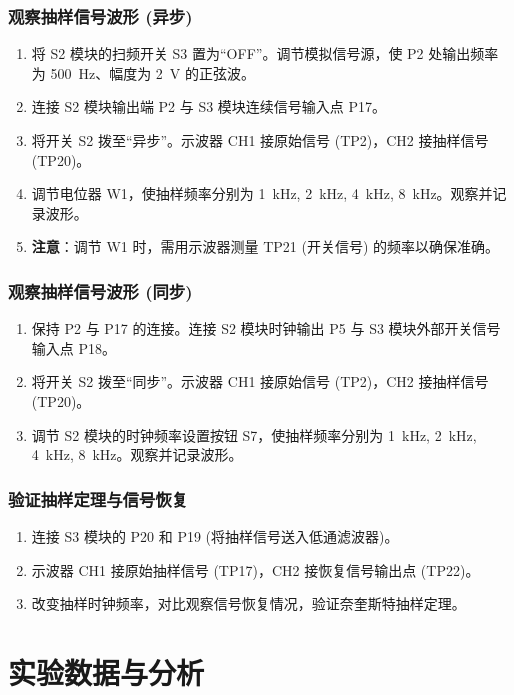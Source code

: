 \documentclass[12pt, a4paper]{ctexrep}
\begin{document}
\subsubsection{观察抽样信号波形 (异步)}
\begin{enumerate}
    \item 将 S2 模块的扫频开关 S3 置为“OFF”。调节模拟信号源，使 P2 处输出频率为 \SI{500}{Hz}、幅度为 \SI{2}{V} 的正弦波。
    \item 连接 S2 模块输出端 P2 与 S3 模块连续信号输入点 P17。
    \item 将开关 S2 拨至“异步”。示波器 CH1 接原始信号 (TP2)，CH2 接抽样信号 (TP20)。
    \item 调节电位器 W1，使抽样频率分别为 \SI{1}{kHz}, \SI{2}{kHz}, \SI{4}{kHz}, \SI{8}{kHz}。观察并记录波形。
    \item \textbf{注意}：调节 W1 时，需用示波器测量 TP21 (开关信号) 的频率以确保准确。
\end{enumerate}

\subsubsection{观察抽样信号波形 (同步)}
\begin{enumerate}
    \item 保持 P2 与 P17 的连接。连接 S2 模块时钟输出 P5 与 S3 模块外部开关信号输入点 P18。
    \item 将开关 S2 拨至“同步”。示波器 CH1 接原始信号 (TP2)，CH2 接抽样信号 (TP20)。
    \item 调节 S2 模块的时钟频率设置按钮 S7，使抽样频率分别为 \SI{1}{kHz}, \SI{2}{kHz}, \SI{4}{kHz}, \SI{8}{kHz}。观察并记录波形。
\end{enumerate}

\subsubsection{验证抽样定理与信号恢复}
\begin{enumerate}
    \item 连接 S3 模块的 P20 和 P19 (将抽样信号送入低通滤波器)。
    \item 示波器 CH1 接原始抽样信号 (TP17)，CH2 接恢复信号输出点 (TP22)。
    \item 改变抽样时钟频率，对比观察信号恢复情况，验证奈奎斯特抽样定理。
\end{enumerate}

\section{实验数据与分析}
\end{document}

